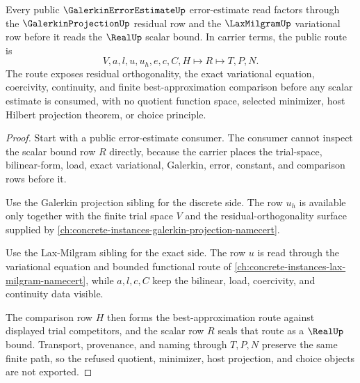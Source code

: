 \begin{theorem}
\label{thm:galerkin-error-estimate-best-approximation-route}
Every public $\GalerkinErrorEstimateUp$ error-estimate read factors through the $\GalerkinProjectionUp$ residual row and the $\LaxMilgramUp$ variational row before it reads the $\RealUp$ scalar bound. In carrier terms, the public route is
$$
V,a,l,u,u_h,e,c,C,H \longmapsto R \longmapsto T,P,N .
$$
The route exposes residual orthogonality, the exact variational equation, coercivity, continuity, and finite best-approximation comparison before any scalar estimate is consumed, with no quotient function space, selected minimizer, host Hilbert projection theorem, or choice principle.
\end{theorem}
\begin{proof}
Start with a public error-estimate consumer. The consumer cannot inspect the scalar bound row $R$ directly, because the carrier places the trial-space, bilinear-form, load, exact variational, Galerkin, error, constant, and comparison rows before it.

Use the Galerkin projection sibling for the discrete side. The row $u_h$ is available only together with the finite trial space $V$ and the residual-orthogonality surface supplied by \autoref{ch:concrete-instances-galerkin-projection-namecert}.

Use the Lax-Milgram sibling for the exact side. The row $u$ is read through the variational equation and bounded functional route of \autoref{ch:concrete-instances-lax-milgram-namecert}, while $a,l,c,C$ keep the bilinear, load, coercivity, and continuity data visible.

The comparison row $H$ then forms the best-approximation route against displayed trial competitors, and the scalar row $R$ seals that route as a $\RealUp$ bound. Transport, provenance, and naming through $T,P,N$ preserve the same finite path, so the refused quotient, minimizer, host projection, and choice objects are not exported.
\end{proof}


